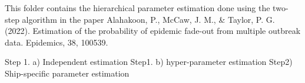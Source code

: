 This folder contains the hierarchical parameter estimation done using the two-step algorithm 
in the paper 
Alahakoon, P., McCaw, J. M., & Taylor, P. G. (2022). Estimation of the probability of epidemic fade-out from multiple outbreak data. Epidemics, 38, 100539.

Step 1. a) Independent estimation 
Step1. b) hyper-parameter estimation
Step2) Ship-specific parameter estimation 
